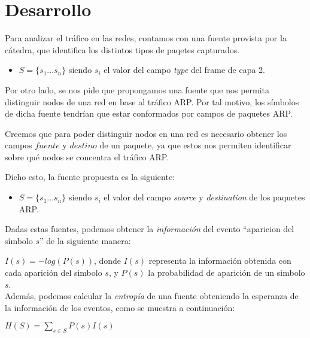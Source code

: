 \section{Desarrollo}

Para analizar el tráfico en las redes, contamos con una fuente provista por la cátedra, que identifica los distintos tipos de paqetes capturados.

\begin{itemize}
\item $S=\{s_1 ... s_n\}$ siendo $s_i$ el valor del campo \textit{type} del frame de capa 2.\\
\end{itemize}

Por otro lado, se nos pide que propongamos una fuente que nos permita distinguir nodos de una red en base al tráfico ARP. Por tal motivo, los símbolos de dicha fuente tendrían que estar conformados por campos de paquetes ARP.

Creemos que para poder distinguir nodos en una red es necesario obtener los campos $fuente$ y $destino$ de un paquete, ya que estos nos permiten identificar sobre qué nodos se concentra el tráfico ARP.

Dicho esto, la fuente propuesta es la siguiente:

\begin{itemize}
\item $S=\{s_1 ... s_n\}$ siendo $s_i$ el valor del campo \textit{source} y \textit{destination} de los paquetes ARP.\\
\end{itemize}


Dadas estas fuentes, podemos obtener la \textit{información} del evento ``aparicion del símbolo $s$'' de la siguiente manera:

$I(s) = -log(P(s))$, donde $I(s)$ representa la información obtenida con cada aparición del simbolo $s$, y $P(s)$ la probabilidad de aparición de un simbolo $s$.\\

Además, podemos calcular la \textit{entropía} de una fuente obteniendo la esperanza de la información de los eventos, como se muestra a continuación:

$H(S) = \sum_{s \in S} P(s) I(s)$


